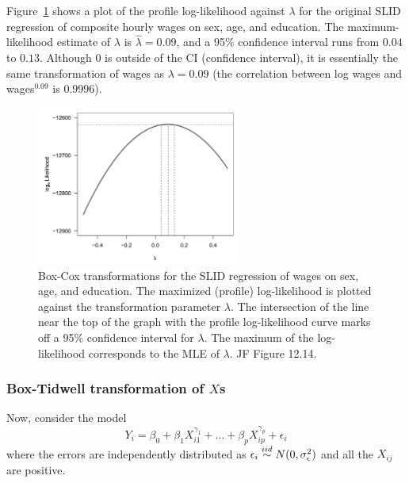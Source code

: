 Figure~\ref{fig:JF_12_14} shows a plot of the profile log-likelihood against $\lambda$ for the original SLID regression of composite hourly wages on sex, age,  and education.
The maximum-likelihood estimate of $\lambda$ is $\hat{\lambda} = 0.09$, and a 95\% confidence interval runs from $0.04$ to $0.13$.
Although $0$ is outside of the CI (confidence interval), it is essentially the same transformation of wages as $\lambda=0.09$ (the correlation between log wages and wages${}^{0.09}$ is $0.9996$).
%
\begin{figure}[H]
\begin{center}
  \includegraphics[width=0.6\textwidth]{Lecture19/JF_12_14}
  \caption{
  Box-Cox transformations for the SLID regression of wages on sex, age, and education.
  The maximized (profile) log-likelihood is plotted against the transformation parameter $\lambda$.
  The intersection of the line near the top of the graph with the profile log-likelihood curve marks off a 95\% confidence interval for $\lambda$.
  The maximum of the log-likelihood corresponds to the MLE of $\lambda$.
   JF Figure 12.14.}
  \label{fig:JF_12_14}
\end{center}
\end{figure}
%

\subsubsection*{Box-Tidwell transformation of $X$s}

Now, consider the model
$$
Y_i = \beta_0 + \beta_1 X_{i1}^{\gamma_1} + \dots +  \beta_p X_{ip}^{\gamma_p}  + \epsilon_i
$$
where the errors are independently distributed as $\epsilon_i \overset{iid}{\sim} N(0, \sigma_\epsilon^2)$ and all the $X_{ij}$ are positive.


